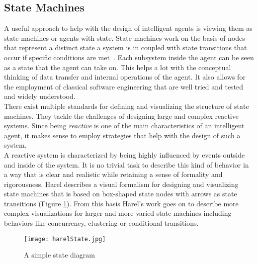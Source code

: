 \subsection{State Machines}
A useful approach to help with the design of intelligent agents is viewing them as state machines or agents with state. State machines work on the basis of nodes that represent a distinct state a system is in coupled with state transitions that occur if specific conditions are met~\cite{Hopcroft2001}. Each subsystem inside the agent can be seen as a state that the agent can take on. This helps a lot with the conceptual thinking of data transfer and internal operations of the agent. It also allows for the employment of classical software engineering that are well tried and tested and widely understood.~\cite{Wooldridge2009}\\
There exist multiple standards for defining and visualizing the structure of state machines. They tackle the challenges of designing large and complex reactive systems. Since being \textit{reactive} is one of the main characteristics of an intelligent agent, it makes sense to employ strategies that help with the design of such a system.~\cite{Harel1985}\\
A reactive system is characterized by being highly influenced by events outside and inside of the system. It is no trivial task to describe this kind of behavior in a way that is clear and realistic while retaining a sense of formality and rigorousness. Harel describes a visual formalism for designing and visualizing state machines that is based on box-shaped state nodes with arrows as state transitions (Figure \ref{fig:harelState}). From this basis Harel's work goes on to describe more complex visualizations for larger and more varied state machines including behaviors like concurrency, clustering or conditional transitions.~\cite{Harel1987}\\
\begin{figure}
	\centering
	\texttt{[image: harelState.jpg]}
	\caption{A simple state diagram~\cite{Harel1987}}
	\label{fig:harelState}
\end{figure}

